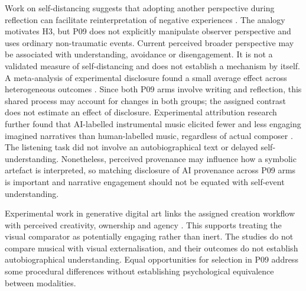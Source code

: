 \documentclass[11pt,a4paper]{article}
\begin{document}
\par Work on self-distancing suggests that adopting another perspective during reflection can facilitate reinterpretation of negative experiences \citep{kross2011}. The analogy motivates H3, but P09 does not explicitly manipulate observer perspective and uses ordinary non-traumatic events. Current perceived broader perspective may be associated with understanding, avoidance or disengagement. It is not a validated measure of self-distancing and does not establish a mechanism by itself.
A meta-analysis of experimental disclosure found a small average effect across heterogeneous outcomes \citep{frattaroli2006}. Since both P09 arms involve writing and reflection, this shared process may account for changes in both groups; the assigned contrast does not estimate an effect of disclosure. Experimental attribution research further found that AI-labelled instrumental music elicited fewer and less engaging imagined narratives than human-labelled music, regardless of actual composer \citep{wuholmes2026}. The listening task did not involve an autobiographical text or delayed self-understanding. Nonetheless, perceived provenance may influence how a symbolic artefact is interpreted, so matching disclosure of AI provenance across P09 arms is important and narrative engagement should not be equated with self-event understanding.

Experimental work in generative digital art links the assigned creation workflow with perceived creativity, ownership and agency \citep{wangchen2026}. This supports treating the visual comparator as potentially engaging rather than inert. The studies do not compare musical with visual externalisation, and their outcomes do not establish autobiographical understanding. Equal opportunities for selection in P09 address some procedural differences without establishing psychological equivalence between modalities.
\end{document}
